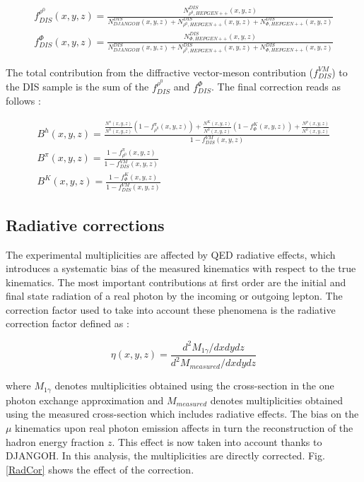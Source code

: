 \documentclass[letterpaper,12pt]{article}
\begin{document}
\begin{equation}
  \begin{split}
    f^{\rho^0}_{DIS}(x,y,z) = \frac{N^{DIS}_{\rho^0,HEPGEN++}(x,y,z)}{N^{DIS}_{DJANGOH}(x,y,z)+N^{DIS}_{\rho^0,HEPGEN++}(x,y,z)+N^{DIS}_{\Phi,HEPGEN++}(x,y,z)} \\
    f^{\Phi}_{DIS}(x,y,z) = \frac{N^{DIS}_{\Phi,HEPGEN++}(x,y,z)}{N^{DIS}_{DJANGOH}(x,y,z)+N^{DIS}_{\rho^0,HEPGEN++}(x,y,z)+N^{DIS}_{\Phi,HEPGEN++}(x,y,z)}
  \end{split}
\end{equation}

The total contribution from the diffractive vector-meson contribution ($f^{VM}_{DIS}$) to the DIS sample is the sum of the $f^{\rho^0}_{DIS}$ and $f^{\Phi}_{DIS}$.
The final correction reads as follows :

\begin{equation}
  \begin{split}
  B^h(x,y,z) = \frac{ \frac{N^{\pi}(x,y,z)}{N^h(x,y,z)}\left (1-f^{\pi}_{\rho^0}(x,y,z)\right )
                   + \frac{N^K(x,y,z)}{N^h(x,y,z)}\left (1-f^{K}_{\Phi}(x,y,z)\right ) + \frac{N^p(x,y,z)}{N^h(x,y,z)} }{1-f^{VM}_{DIS}(x,y,z)} \\
  B^{\pi}(x,y,z) = \frac{1-f^{\pi}_{\rho^0}(x,y,z)}{1-f^{VM}_{DIS}(x,y,z)} \\
  B^K(x,y,z) = \frac{1-f^{K}_{\Phi}(x,y,z)}{1-f^{VM}_{DIS}(x,y,z)}
  \end{split}
\end{equation}

\subsection{Radiative corrections}

The experimental multiplicities are affected by QED radiative effects, which introduces a systematic bias of the measured kinematics with respect to the true kinematics. The most important contributions at first order are the initial and final state radiation of a real photon by the incoming or outgoing lepton. The correction factor used to take into account these phenomena is the radiative correction factor defined as :

\begin{equation}
	\eta(x,y,z) = \frac{d^2 M_{1\gamma}/dxdydz}{d^2 M_{measured}/dxdydz}
\end{equation}

where $M_{1\gamma}$ denotes multiplicities obtained using the cross-section in the one photon exchange approximation and $M_{measured}$ denotes multiplicities obtained using the measured cross-section which includes radiative effects. The bias on the $\mu$ kinematics upon real photon emission affects in turn the reconstruction of the hadron energy fraction $z$. This effect is now taken into account thanks to DJANGOH. In this analysis, the multiplicities are directly corrected. Fig.\ref{RadCor} shows the effect of the correction.
\end{document}
